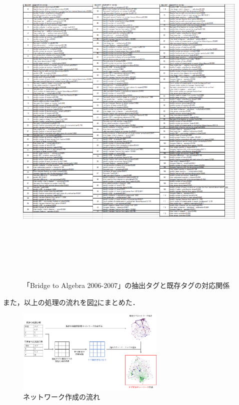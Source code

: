\begin{figure}[p]
\begin{center}
\includegraphics[height=500pt]{./img/kTable.png}
\end{center}
\caption{「Bridge to Algebra 2006-2007」の抽出タグと既存タグの対応関係}
\label{fig:kTable}
\end{figure}


また，以上の処理の流れを図\ref{fig:networkflow}にまとめた．

\begin{figure}[htb]
\begin{center}
\includegraphics[width=200pt]{./img/networkflow.png}
\end{center}
\caption{ネットワーク作成の流れ}
\label{fig:networkflow}
\end{figure}


